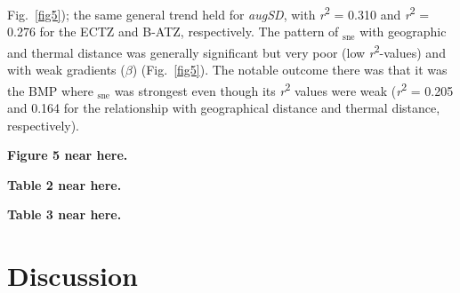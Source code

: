\documentclass[utf8]{frontiersSCNS} %
\begin{document}
Fig.~\ref{fig5}); the same general trend held for \emph{augSD}, with \emph{r}\textsuperscript{2} = 0.310 and \emph{r}\textsuperscript{2} = 0.276 for the ECTZ and B-ATZ, respectively. The pattern of \textbeta$_{\text{sne}}$ with geographic and thermal distance was generally significant but very poor (low \emph{r}\textsuperscript{2}-values) and with weak gradients ($\beta$) (Fig.~\ref{fig5}). The notable outcome there was that it was the BMP where \textbeta$_{\text{sne}}$ was strongest even though its \emph{r}\textsuperscript{2} values were weak (\emph{r}\textsuperscript{2} = 0.205 and 0.164 for the relationship with geographical distance and thermal distance, respectively).

\textbf{Figure 5 near here.}

\textbf{Table 2 near here.}

\textbf{Table 3 near here.}

\section{Discussion}
\end{document}
